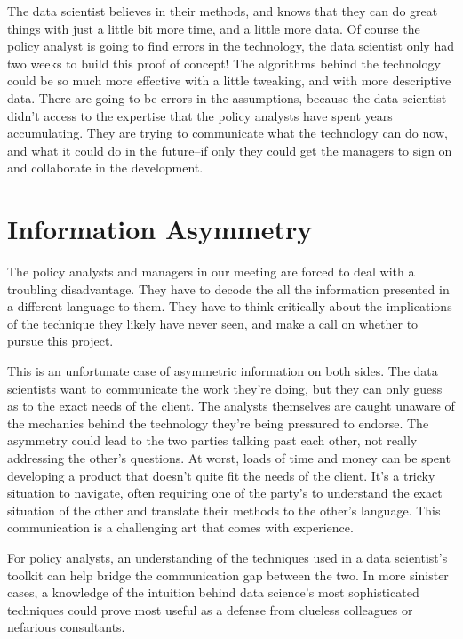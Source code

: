 \documentclass[]{book}
\begin{document}
The data scientist believes in their methods, and knows that they can do great things with just a little bit more time, and a little more data. Of course the policy analyst is going to find errors in the technology, the data scientist only had two weeks to build this proof of concept! The algorithms behind the technology could be so much more effective with a little tweaking, and with more descriptive data. There are going to be errors in the assumptions, because the data scientist didn't access to the expertise that the policy analysts have spent years accumulating. They are trying to communicate what the technology can do now, and what it could do in the future--if only they could get the managers to sign on and collaborate in the development.

\hypertarget{information-asymmetry}{%
\section{Information Asymmetry}\label{information-asymmetry}}

The policy analysts and managers in our meeting are forced to deal with a troubling disadvantage. They have to decode the all the information presented in a different language to them. They have to think critically about the implications of the technique they likely have never seen, and make a call on whether to pursue this project.

This is an unfortunate case of asymmetric information on both sides. The data scientists want to communicate the work they're doing, but they can only guess as to the exact needs of the client. The analysts themselves are caught unaware of the mechanics behind the technology they're being pressured to endorse. The asymmetry could lead to the two parties talking past each other, not really addressing the other's questions. At worst, loads of time and money can be spent developing a product that doesn't quite fit the needs of the client. It's a tricky situation to navigate, often requiring one of the party's to understand the exact situation of the other and translate their methods to the other's language. This communication is a challenging art that comes with experience.

For policy analysts, an understanding of the techniques used in a data scientist's toolkit can help bridge the communication gap between the two. In more sinister cases, a knowledge of the intuition behind data science's most sophisticated techniques could prove most useful as a defense from clueless colleagues or nefarious consultants.
\end{document}
